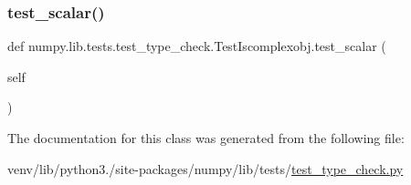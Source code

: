 \subsubsection{\texorpdfstring{test\+\_\+scalar()}{test\_scalar()}}
{\footnotesize\ttfamily def numpy.\+lib.\+tests.\+test\+\_\+type\+\_\+check.\+Test\+Iscomplexobj.\+test\+\_\+scalar (\begin{DoxyParamCaption}\item[{}]{self }\end{DoxyParamCaption})}



The documentation for this class was generated from the following file\+:\begin{DoxyCompactItemize}
\item 
venv/lib/python3./site-\/packages/numpy/lib/tests/\hyperlink{test__type__check_8py}{test\+\_\+type\+\_\+check.\+py}\end{DoxyCompactItemize}

